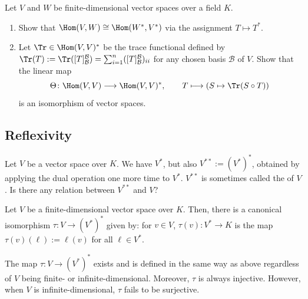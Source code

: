 \begin{exercise}
\label{exc:hom_dual_isomorphism_trace_pairing}
Let $V$ and $W$ be finite-di\-men\-sional vector spaces over a field $K$.
\begin{enumerate}[label=\textbf{(\alph*)}]
    \item Show that $\Hom(V, W) \cong \Hom(W^*, V^*)$ via the assignment $T \mapsto T^*$.
    \item Let $\Tr \in \Hom(V, V)^*$ be the trace functional defined by $\Tr(T) := \Tr([T]_{\mathcal{B}}^{\mathcal{B}}) = \sum_{i=1}^n ([T]_{\mathcal{B}}^{\mathcal{B}})_{ii}$ for any chosen basis $\mathcal{B}$ of $V$.
    Show that the linear map
    \[
    \Theta \colon \Hom(V, V) \longrightarrow \Hom(V, V)^*, \qquad T \longmapsto \left( S \mapsto \Tr(S \circ T) \right)
    \]
    is an isomorphism of vector spaces.
\end{enumerate}
\end{exercise}

\subsection{Reflexivity}
Let $V$ be a vector space over $K$. We have $V^*$, but also $V^{**} := (V^*)^*$, obtained by applying the dual operation one more time to $V^*$. $V^{**}$ is sometimes called the  of $V$. Is there any relation between $V^{**}$ and $V$?

\begin{theorem}
\label{thm:natural_map_injective}
  Let $V$ be a finite-di\-men\-sional vector space over $K$. Then, there is a canonical isomorphism $\tau \colon V \to (V^*)^*$ given by: for $v \in V$, $\tau(v) \colon V^* \to K$ is the map $\tau(v)(\ell) := \ell(v)$ for all $\ell \in V^*$.
\end{theorem}

\begin{remark}
  The map $\tau \colon V \to (V^*)^*$ exists and is defined in the same way as above regardless of $V$ being finite- or infinite-di\-men\-sional. Moreover, $\tau$ is always injective. However, when $V$ is infinite-di\-men\-sional, $\tau$ fails to be surjective.
\end{remark}

